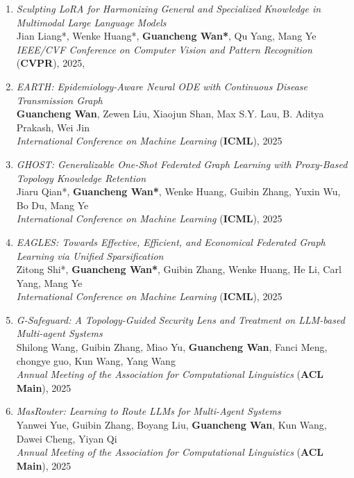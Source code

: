 \begin{enumerate}
    \item \textit{Sculpting LoRA for Harmonizing General and Specialized Knowledge in Multimodal Large Language Models} \\
    Jian Liang*, Wenke Huang*, \textbf{Guancheng Wan*}, Qu Yang, Mang Ye \\
    \hfill \textit{IEEE/CVF Conference on Computer Vision and Pattern Recognition} (\textbf{CVPR}), 2025, {}

    \item \textit{EARTH: Epidemiology-Aware Neural ODE with Continuous Disease Transmission Graph} \\
    \textbf{Guancheng Wan}, Zewen Liu, Xiaojun Shan, Max S.Y. Lau, B. Aditya Prakash, Wei Jin \\
    \hfill \textit{International Conference on Machine Learning} (\textbf{ICML}), 2025

    \item \textit{GHOST: Generalizable One-Shot Federated Graph Learning with Proxy-Based Topology Knowledge Retention} \\
    Jiaru Qian*, \textbf{Guancheng Wan*}, Wenke Huang, Guibin Zhang, Yuxin Wu, Bo Du, Mang Ye \\
    \hfill \textit{International Conference on Machine Learning} (\textbf{ICML}), 2025

    \item \textit{EAGLES: Towards Effective, Efficient, and Economical Federated Graph Learning via Unified Sparsification} \\
    Zitong Shi*, \textbf{Guancheng Wan*}, Guibin Zhang, Wenke Huang, He Li, Carl Yang, Mang Ye \\
    \hfill \textit{International Conference on Machine Learning} (\textbf{ICML}), 2025

    \item \textit{G-Safeguard: A Topology-Guided Security Lens and Treatment on LLM-based Multi-agent Systems} \\
    Shilong Wang, Guibin Zhang, Miao Yu, \textbf{Guancheng Wan}, Fanci Meng, chongye guo, Kun Wang, Yang Wang \\
    \hfill \textit{Annual Meeting of the Association for Computational Linguistics} (\textbf{ACL Main}), 2025

    \item \textit{MasRouter: Learning to Route LLMs for Multi-Agent Systems} \\
    Yanwei Yue, Guibin Zhang, Boyang Liu, \textbf{Guancheng Wan}, Kun Wang, Dawei Cheng, Yiyan Qi \\
    \hfill \textit{Annual Meeting of the Association for Computational Linguistics} (\textbf{ACL Main}), 2025 %


\end{enumerate}
